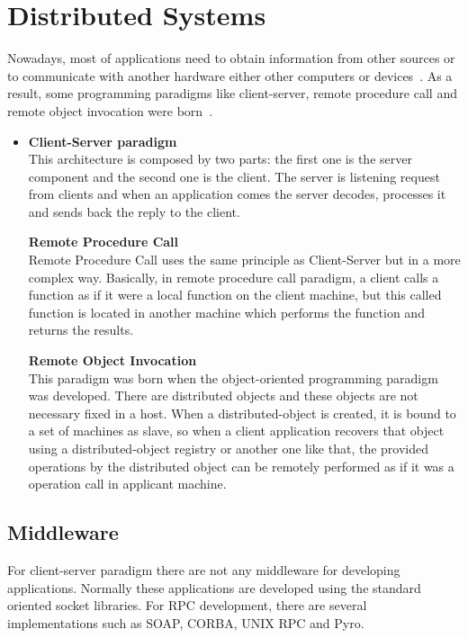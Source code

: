 \section{Distributed Systems}
Nowadays, most of applications need to obtain information from other sources
or to communicate with another hardware either other computers or
devices~\cite{UNADEELLAS}. As a
result, some programming paradigms like client-server, remote procedure call and
remote object invocation were born~\cite{LAOTRA}.
\begin{itemize}
\item \textbf{Client-Server paradigm}~\\
This architecture is composed by two parts: the first one is the server
component and the second one is the client. The server is listening request from
clients and when an application comes the server decodes, processes it and
sends back the reply to the client.

\textbf{Remote Procedure Call}~\\
Remote Procedure Call uses the same principle as Client-Server but in a more
complex way. Basically, in remote procedure call paradigm, a client calls a
function as if it were a local function on the client machine, but this called
function is located in another machine which performs the function and returns
the results.

\textbf{Remote Object Invocation}~\\
This paradigm was born when the object-oriented programming paradigm was
developed. There are distributed objects and these objects are not
necessary fixed in a host. When a distributed-object is created, it is
bound to a set of machines as slave, so when a client application recovers that
object using a distributed-object registry or another one like that, the
provided operations by the distributed object can be remotely performed as if
it was a  operation call in applicant machine.
\end{itemize}

\subsection{Middleware}

For client-server paradigm there are not any middleware for developing
applications. Normally these applications are developed using the standard
oriented socket libraries.
For \ac{RPC} development, there are several implementations such as
\ac{SOAP}, \ac{CORBA}, UNIX \ac{RPC} and Pyro.

